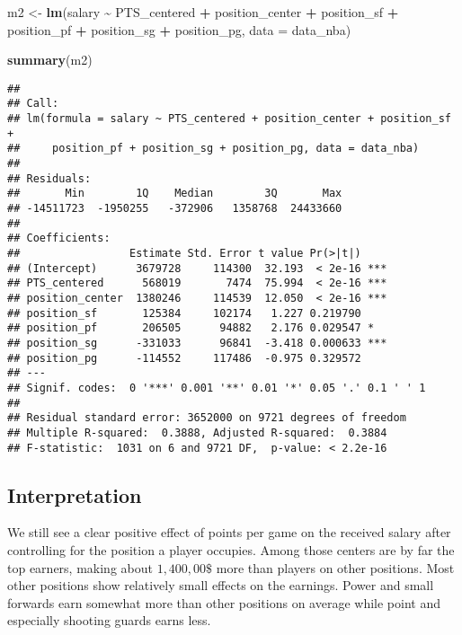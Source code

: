 \documentclass[
]{book}
\newenvironment{Shaded}{\begin{snugshade}}{\end{snugshade}}
\newcommand{\AttributeTok}[1]{\textcolor[rgb]{0.13,0.29,0.53}{#1}}
\newcommand{\FunctionTok}[1]{\textcolor[rgb]{0.13,0.29,0.53}{\textbf{#1}}}
\newcommand{\NormalTok}[1]{#1}
\newcommand{\OtherTok}[1]{\textcolor[rgb]{0.56,0.35,0.01}{#1}}
\newcommand{\SpecialCharTok}[1]{\textcolor[rgb]{0.81,0.36,0.00}{\textbf{#1}}}
\begin{document}
\begin{Shaded}
\begin{Highlighting}[]
\NormalTok{m2 }\OtherTok{\textless{}{-}} \FunctionTok{lm}\NormalTok{(salary }\SpecialCharTok{\textasciitilde{}}\NormalTok{ PTS\_centered }\SpecialCharTok{+}\NormalTok{ position\_center }\SpecialCharTok{+}\NormalTok{ position\_sf }\SpecialCharTok{+}\NormalTok{  position\_pf }\SpecialCharTok{+}\NormalTok{ position\_sg }\SpecialCharTok{+}\NormalTok{ position\_pg, }\AttributeTok{data =}\NormalTok{ data\_nba)}

\FunctionTok{summary}\NormalTok{(m2)}
\end{Highlighting}
\end{Shaded}

\begin{verbatim}
## 
## Call:
## lm(formula = salary ~ PTS_centered + position_center + position_sf + 
##     position_pf + position_sg + position_pg, data = data_nba)
## 
## Residuals:
##       Min        1Q    Median        3Q       Max 
## -14511723  -1950255   -372906   1358768  24433660 
## 
## Coefficients:
##                 Estimate Std. Error t value Pr(>|t|)    
## (Intercept)      3679728     114300  32.193  < 2e-16 ***
## PTS_centered      568019       7474  75.994  < 2e-16 ***
## position_center  1380246     114539  12.050  < 2e-16 ***
## position_sf       125384     102174   1.227 0.219790    
## position_pf       206505      94882   2.176 0.029547 *  
## position_sg      -331033      96841  -3.418 0.000633 ***
## position_pg      -114552     117486  -0.975 0.329572    
## ---
## Signif. codes:  0 '***' 0.001 '**' 0.01 '*' 0.05 '.' 0.1 ' ' 1
## 
## Residual standard error: 3652000 on 9721 degrees of freedom
## Multiple R-squared:  0.3888, Adjusted R-squared:  0.3884 
## F-statistic:  1031 on 6 and 9721 DF,  p-value: < 2.2e-16
\end{verbatim}

\hypertarget{interpretation-2}{%
\subsection{Interpretation}\label{interpretation-2}}

We still see a clear positive effect of points per game on the received salary
after controlling for the position a player occupies. Among those centers are by
far the top earners, making about \(1,400,00\$\) more than players on other
positions. Most other positions show relatively small effects on the earnings.
Power and small forwards earn somewhat more than other positions on average
while point and especially shooting guards earns less.
\end{document}
